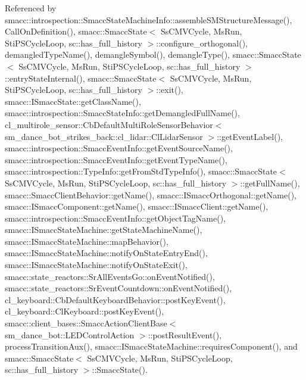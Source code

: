 Referenced by smacc\+::introspection\+::\+Smacc\+State\+Machine\+Info\+::assemble\+S\+M\+Structure\+Message(), Call\+On\+Definition(), smacc\+::\+Smacc\+State$<$ Ss\+C\+M\+V\+Cycle, Ms\+Run, Sti\+P\+S\+Cycle\+Loop, sc\+::has\+\_\+full\+\_\+history $>$\+::configure\+\_\+orthogonal(), demangled\+Type\+Name(), demangle\+Symbol(), demangle\+Type(), smacc\+::\+Smacc\+State$<$ Ss\+C\+M\+V\+Cycle, Ms\+Run, Sti\+P\+S\+Cycle\+Loop, sc\+::has\+\_\+full\+\_\+history $>$\+::entry\+State\+Internal(), smacc\+::\+Smacc\+State$<$ Ss\+C\+M\+V\+Cycle, Ms\+Run, Sti\+P\+S\+Cycle\+Loop, sc\+::has\+\_\+full\+\_\+history $>$\+::exit(), smacc\+::\+I\+Smacc\+State\+::get\+Class\+Name(), smacc\+::introspection\+::\+Smacc\+State\+Info\+::get\+Demangled\+Full\+Name(), cl\+\_\+multirole\+\_\+sensor\+::\+Cb\+Default\+Multi\+Role\+Sensor\+Behavior$<$ sm\+\_\+dance\+\_\+bot\+\_\+strikes\+\_\+back\+::cl\+\_\+lidar\+::\+Cl\+Lidar\+Sensor $>$\+::get\+Event\+Label(), smacc\+::introspection\+::\+Smacc\+Event\+Info\+::get\+Event\+Source\+Name(), smacc\+::introspection\+::\+Smacc\+Event\+Info\+::get\+Event\+Type\+Name(), smacc\+::introspection\+::\+Type\+Info\+::get\+From\+Std\+Type\+Info(), smacc\+::\+Smacc\+State$<$ Ss\+C\+M\+V\+Cycle, Ms\+Run, Sti\+P\+S\+Cycle\+Loop, sc\+::has\+\_\+full\+\_\+history $>$\+::get\+Full\+Name(), smacc\+::\+Smacc\+Client\+Behavior\+::get\+Name(), smacc\+::\+I\+Smacc\+Orthogonal\+::get\+Name(), smacc\+::\+I\+Smacc\+Component\+::get\+Name(), smacc\+::\+I\+Smacc\+Client\+::get\+Name(), smacc\+::introspection\+::\+Smacc\+Event\+Info\+::get\+Object\+Tag\+Name(), smacc\+::\+I\+Smacc\+State\+Machine\+::get\+State\+Machine\+Name(), smacc\+::\+I\+Smacc\+State\+Machine\+::map\+Behavior(), smacc\+::\+I\+Smacc\+State\+Machine\+::notify\+On\+State\+Entry\+End(), smacc\+::\+I\+Smacc\+State\+Machine\+::notify\+On\+State\+Exit(), smacc\+::state\+\_\+reactors\+::\+Sr\+All\+Events\+Go\+::on\+Event\+Notified(), smacc\+::state\+\_\+reactors\+::\+Sr\+Event\+Countdown\+::on\+Event\+Notified(), cl\+\_\+keyboard\+::\+Cb\+Default\+Keyboard\+Behavior\+::post\+Key\+Event(), cl\+\_\+keyboard\+::\+Cl\+Keyboard\+::post\+Key\+Event(), smacc\+::client\+\_\+bases\+::\+Smacc\+Action\+Client\+Base$<$ sm\+\_\+dance\+\_\+bot\+::\+L\+E\+D\+Control\+Action $>$\+::post\+Result\+Event(), process\+Transition\+Aux(), smacc\+::\+I\+Smacc\+State\+Machine\+::requires\+Component(), and smacc\+::\+Smacc\+State$<$ Ss\+C\+M\+V\+Cycle, Ms\+Run, Sti\+P\+S\+Cycle\+Loop, sc\+::has\+\_\+full\+\_\+history $>$\+::\+Smacc\+State().


